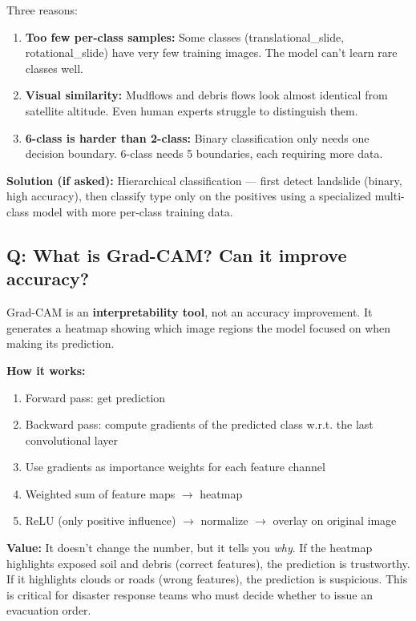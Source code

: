 \documentclass[11pt]{article}
\begin{document}
Three reasons:
\begin{enumerate}[noitemsep]
    \item \textbf{Too few per-class samples:} Some classes (translational\_slide, rotational\_slide) have very few training images. The model can't learn rare classes well.
    \item \textbf{Visual similarity:} Mudflows and debris flows look almost identical from satellite altitude. Even human experts struggle to distinguish them.
    \item \textbf{6-class is harder than 2-class:} Binary classification only needs one decision boundary. 6-class needs 5 boundaries, each requiring more data.
\end{enumerate}

\textbf{Solution (if asked):} Hierarchical classification --- first detect landslide (binary, high accuracy), then classify type only on the positives using a specialized multi-class model with more per-class training data.

\subsection{Q: What is Grad-CAM? Can it improve accuracy?}

Grad-CAM is an \textbf{interpretability tool}, not an accuracy improvement. It generates a heatmap showing which image regions the model focused on when making its prediction.

\textbf{How it works:}
\begin{enumerate}[noitemsep]
    \item Forward pass: get prediction
    \item Backward pass: compute gradients of the predicted class w.r.t. the last convolutional layer
    \item Use gradients as importance weights for each feature channel
    \item Weighted sum of feature maps $\to$ heatmap
    \item ReLU (only positive influence) $\to$ normalize $\to$ overlay on original image
\end{enumerate}

\textbf{Value:} It doesn't change the number, but it tells you \textit{why}. If the heatmap highlights exposed soil and debris (correct features), the prediction is trustworthy. If it highlights clouds or roads (wrong features), the prediction is suspicious. This is critical for disaster response teams who must decide whether to issue an evacuation order.
\end{document}
